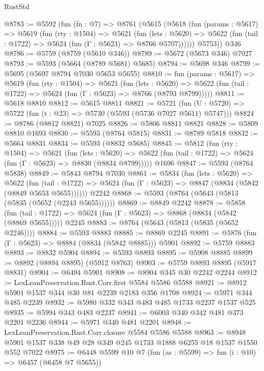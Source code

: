 \begin{lexlean}{RustStd}
\begin{coremodule}
@8783 := @5592
    (fun (fn : @7) =>
    @8761
      (@5615
        (@5618
          (fun (params : @5617) =>
          @5619
            (fun (rty : @1504) =>
            @5621
              (fun (lets : @5620) =>
              @5622 (fun (tail : @1722) => @5624 (fun (Γ : @5623) => @8766 @5707))))))
        @5753))
    @346
@8786 := @5759 (@8759 (@5610 @346))
@8789 := @5672 (@5673 @346) @7027
@8793 := @5593 (@5664 (@8789 @5681) @5685)
@8794 := @5698 @346
@8799 := @5695 (@5697 @8794 @7030 @5653 @5655)
@8810 := fun (params : @5617) =>
  @5619
    (fun (rty : @1504) =>
    @5621
      (fun (lets : @5620) =>
      @5622 (fun (tail : @1722) => @5624 (fun (Γ : @5623) => @8766 (@8793 @8799)))))
@8811 := @5618 @8810
@8812 := @5615 @8811
@8821 := @5721 (fun (U : @5720) => @5722 (fun (t : @23) => @5730 (@5593 (@5736 @7027 @5611) @5747)))
@8824 := @8786 (@8812 @8821) @7025
@8826 := @5806 @8811 @8821
@8828 := @5809 @8810 @1693
@8830 := @5593 (@8764 @5815)
@8831 := @8789 @5818
@8832 := @5664 @8831
@8834 := @5593 (@8832 @5685)
@8845 := @5812
    (fun (rty : @1504) =>
    @5621
      (fun (lets : @5620) =>
      @5622 (fun (tail : @1722) => @5624 (fun (Γ : @5623) => @8830 (@8834 @8799)))))
    @1696
@8847 := @5593 (@8764 @5838)
@8849 := @5843 @8794 @7030
@8861 := @5834
    (fun (lets : @5620) =>
    @5622
      (fun (tail : @1722) => @5624 (fun (Γ : @5623) => @8847 (@8834 (@5842 (@8849 @5653 @5655))))))
    @2242
@8868 := @5593 (@8764 (@5643 (@5813 (@5835 (@5652 (@2243 @5655))))))
@8869 := @8849 @2242
@8878 := @5858
    (fun (tail : @1722) => @5624 (fun (Γ : @5623) => @8868 (@8834 (@5842 (@8869 @5655)))))
    @2245
@8883 := @8764 (@5643 (@5813 (@5835 (@5652 @2246))))
@8884 := @5593 @8883
@8885 := @8869 @2245
@8891 := @5876 (fun (Γ : @5623) => @8884 (@8834 (@5842 @8885))) @5901
@8892 := @5759 @8883
@8893 := @8832 @5904
@8894 := @5593 @8893
@8895 := @5908 @8885
@8899 := @8892 (@8894 @8895) (@5912 @8763)
@8903 := @5759 @8893 @8895 (@5917 @8831)
@8904 := @6494 @5901
@8908 := @8904 @345 @30 @2242 @2244
@8912 := LexLeanPreservation.Rust.Corr.first @5584 @5586 @5588
@8921 := @8912 @5901 @1537 @344 @30 @81 @2239 @2183 @356 @1708
@8924 := @5971 @344 @485 @2239
@8932 := @5980 @332 @343 @483 @485 @1733 @2237 @1537 @525
@8935 := @5994 @343 @483 @2237
@8941 := @6003 @340 @342 @481 @373 @2201 @2236
@8944 := @5971 @340 @481 @2201
@8948 := LexLeanPreservation.Rust.Corr.closure @5584 @5586 @5588
@8963 := @8948 @5901 @1537 @338 @49 @28 @349 @245 @1733 @1888 @6255 @18 @1537 @1550 @552 @7022
@8975 := @6448
    @5599
    @10
    @7
    (fun (as : @5599) => fun (i : @10) => @6457 (@6458 @7 @5655))

\end{coremodule}
\end{lexlean}
